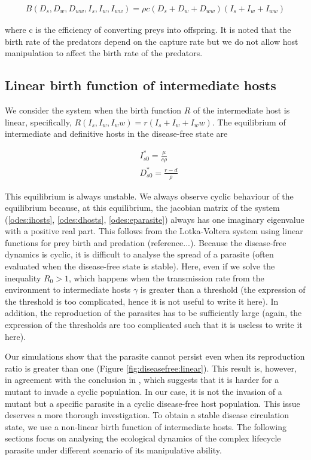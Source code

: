 \documentclass[11pt]{article}
\begin{document}
\begin{align*}
B(D_s, D_w, D_{ww}, I_s, I_w, I_{ww}) = \rho c (D_s + D_w + D_{ww}) (I_s + I_w + I_{ww})
\end{align*}

where c is the efficiency of converting preys into offspring. It is noted that the birth rate of the predators depend on the capture rate but we do not allow host manipulation to affect the birth rate of the predators.

\subsection*{Linear birth function of intermediate hosts}
We consider the system when the birth function $R$ of the intermediate host is linear, specifically, $R(I_s, I_w, I_ww) = r(I_s + I_w + I_ww)$. The equilibrium of intermediate and definitive hosts in the disease-free state are

\begin{align*}
& I_{s0}^* = \frac{\mu}{c \rho} \\
& D_{s0}^* = \frac{r - d}{\rho}
\end{align*}

This equilibrium is always unstable. 
We always observe cyclic behaviour of the equilibrium because, at this equilibrium, the jacobian matrix of the system (\ref{odes:ihosts}, \ref{odes:dhosts}, \ref{odes:eparasite}) always has one imaginary eigenvalue with a positive real part. 
This follows from the Lotka-Voltera system using linear functions for prey birth and predation (reference...). 
Because the disease-free dynamics is cyclic, it is difficult to analyse the spread of a parasite (often evaluated when the disease-free state is stable). 
Here, even if we solve the inequality $R_0 > 1$, which happens when the transmission rate from the environment to intermediate hosts $\gamma$ is greater than a threshold (the expression of the threshold is too complicated, hence it is not useful to write it here). 
In addition, the reproduction of the parasites has to be sufficiently large (again, the expression of the thresholds are too complicated such that it is useless to write it here).

Our simulations show that the parasite cannot persist even when its reproduction ratio is greater than one (Figure \ref{fig:diseasefree:linear}). This result is, however, in agreement with the conclusion in \cite{Ripa:Evol:2013}, which suggests that it is harder for a mutant to invade a cyclic population. 
In our case, it is not the invasion of a mutant but a specific parasite in a cyclic disease-free host population. 
This issue deserves a more thorough investigation. 
To obtain a stable disease circulation state, we use a non-linear birth function of intermediate hosts. The following sections focus on analysing the ecological dynamics of the complex lifecycle parasite under different scenario of its manipulative ability.
\end{document}
